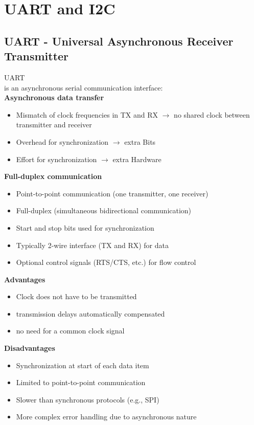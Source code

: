 
\section{UART and I2C}

\subsection{UART - Universal Asynchronous Receiver Transmitter}


\begin{definition}{UART}\\ is an asynchronous serial communication interface:
    \vspace{1mm}\\
    \textbf{Asynchronous data transfer}
    \begin{itemize}
        \item Mismatch of clock frequencies in TX and RX $\rightarrow$ no shared clock between transmitter and receiver
        \item Overhead for synchronization $\rightarrow$ extra Bits
        \item Effort for synchronization $\rightarrow$ extra Hardware
    \end{itemize}
    \vspace{1mm}

    \textbf{Full-duplex communication}
    \begin{itemize}
        \item Point-to-point communication (one transmitter, one receiver)
        \item Full-duplex (simultaneous bidirectional communication)
        \item Start and stop bits used for synchronization
        \item Typically 2-wire interface (TX and RX) for data
        \item Optional control signals (RTS/CTS, etc.) for flow control
    \end{itemize}

    \textbf{Advantages}
    \begin{itemize}
        \item Clock does not have to be transmitted
        \item transmission delays automatically compensated
        \item no need for a common clock signal
    \end{itemize}
    \vspace{1mm}
    
    \textbf{Disadvantages}
    \begin{itemize}
        \item Synchronization at start of each data item
        \item Limited to point-to-point communication
        \item Slower than synchronous protocols (e.g., SPI)
        \item More complex error handling due to asynchronous nature
    \end{itemize}
\end{definition}

